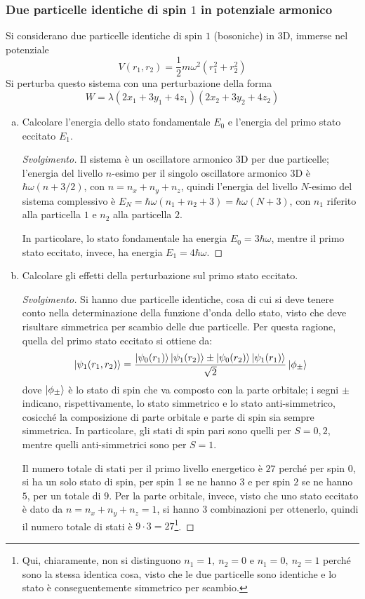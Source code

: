\documentclass[11pt, a4paper]{scrartcl} %
\numberwithin{equation}{subsection}
\theoremstyle{style2}
\theoremstyle{style1}
\renewcommand\qedsymbol{$\blacksquare$}
\newenvironment{svolgimento}{\renewcommand\qedsymbol{$\spadesuit$}\begin{proof}[Svolgimento]}{\end{proof}}
\begin{document}
\subsubsection{Due particelle identiche di spin $1$ in potenziale armonico}
Si considerano due particelle identiche di spin $1$ (bosoniche) in 3D, immerse nel potenziale
\[
V(r_1,r_2) = \frac{1}{2} m\omega^2 ( r_1^2 + r_2^2)
\] 
Si perturba questo sistema con una perturbazione della forma 
\[
W = \lambda (2x_1 + 3y_1 + 4z_1) (2x_2 + 3y_2 + 4z_2)
\] 
\begin{enumerate}[(a).]
	\item Calcolare l'energia dello stato fondamentale $E_0$ e l'energia del primo stato eccitato $E_1$.
		\begin{svolgimento}
			Il sistema \`e un oscillatore armonico 3D per due particelle; l'energia del livello $n$-esimo per il singolo oscillatore armonico 3D \`e $ \hbar \omega (n + 3/2)$, con $n = n_x + n_y + n_z$, quindi l'energia del livello $N$-esimo del sistema complessivo \`e $E_N = \hbar \omega (n_1 + n_2 + 3) = \hbar \omega (N + 3)$, con $n_1$ riferito alla particella $1 $ e $n_2$ alla particella $2$.

			In particolare, lo stato fondamentale ha energia $E_0 =3 \hbar \omega  $, mentre il primo stato eccitato, invece, ha energia $E_1 = 4\hbar  \omega$.
		\end{svolgimento}
	\item Calcolare gli effetti della perturbazione sul primo stato eccitato.
		\begin{svolgimento}
			Si hanno due particelle identiche, cosa di cui si deve tenere conto nella determinazione della funzione d'onda dello stato, visto che deve risultare simmetrica per scambio delle due particelle.
			Per questa ragione, quella del primo stato eccitato si ottiene da:
			\[
				\ket{\psi_1 (r_1,r_2)}  = \frac{\ket{\psi _0(r_1)} \ket{\psi _1(r_2)} \pm \ket{\psi _0(r_2)} \ket{\psi _1(r_1)} }{\sqrt{2} } \ket{\phi _{\pm} } 
			\] 
			dove $\ket{\phi _{\pm}} $ \`e lo stato di spin che va composto con la parte orbitale; i segni $\pm$ indicano, rispettivamente, lo stato simmetrico e lo stato anti-simmetrico, cosicch\'e la composizione di parte orbitale e parte di spin sia sempre simmetrica.
			In particolare, gli stati di spin pari sono quelli per $S = 0,2$, mentre quelli anti-simmetrici sono per $S = 1$.

			Il numero totale di stati per il primo livello energetico \`e $27$ perch\'e per spin $0$, si ha un solo stato di spin, per spin 1 se ne hanno $3$ e per spin $2$ se ne hanno $5$, per un totale di $9$. 
			Per la parte orbitale, invece, visto che uno stato eccitato \`e dato da $n=n_x + n_y +n_z=1$, si hanno $3$ combinazioni per ottenerlo, quindi il numero totale di stati \`e $9\cdot 3 = 27$\footnote{Qui, chiaramente, non si distinguono $n_1 =1, \ n_2=0 $ e $n_1=0,\ n_2 = 1$ perch\'e sono la stessa identica cosa, visto che le due particelle sono identiche e lo stato \`e conseguentemente simmetrico per scambio.}.


\end{svolgimento}
\end{enumerate}
\end{document}
